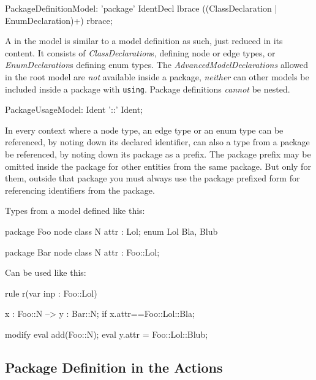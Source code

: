 \begin{rail}
  PackageDefinitionModel: 'package' IdentDecl lbrace
	                   ((ClassDeclaration
  									 | EnumDeclaration)+)
										rbrace;
\end{rail}

A  in the model is similar to a model definition as such, just reduced in its content.
It consists of \emph{ClassDeclaration}s, defining node or edge types, or \emph{EnumDeclaration}s defining enum types.
The \emph{AdvancedModelDeclarations} allowed in the root model are \emph{not} available inside a package, \emph{neither} can other models be included inside a package with \texttt{using}.
Package definitions \emph{cannot} be nested.

\begin{rail}
  PackageUsageModel: Ident '::' Ident;
\end{rail}

In every context where a node type, an edge type or an enum type can be referenced,
by noting down its declared identifier, 
can also a type from a package be referenced,
by noting down its package as a prefix.
The package prefix may be omitted inside the package for other entities from the same package.
But only for them, outside that package you must always use the package prefixed form for referencing identifiers from the package.

\begin{example}
Types from a model defined like this:
	\begin{grgen}
package Foo {
	node class N {
		attr : Lol;
	}
	enum Lol {
		Bla,
		Blub
	}
}

package Bar {
	node class N {
		attr : Foo::Lol;
	}	
}
	\end{grgen}
Can be used like this:
	\begin{grgen}
rule r(var inp : Foo::Lol) {
	x : Foo::N --> y : Bar::N;
	if{ x.attr==Foo::Lol::Bla; }

	modify {
		eval{ add(Foo::N); }
		eval{ y.attr = Foo::Lol::Blub; }
	}
}	
	\end{grgen}
\end{example}
	
\subsection{Package Definition in the Actions}\label{sub:packageaction} 

